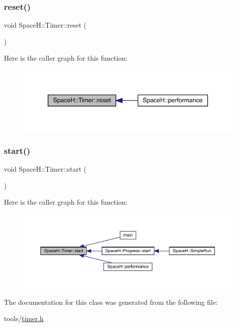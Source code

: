 \subsubsection{\texorpdfstring{reset()}{reset()}}
{\footnotesize\ttfamily void Space\+H\+::\+Timer\+::reset (\begin{DoxyParamCaption}{ }\end{DoxyParamCaption})\hspace{0.3cm}{\ttfamily [inline]}}

Here is the caller graph for this function\+:
\nopagebreak
\begin{figure}[H]
\begin{center}
\leavevmode
\includegraphics[width=339pt]{class_space_h_1_1_timer_a80e119ed1c08d10f36b725cfb85fd8c1_icgraph}
\end{center}
\end{figure}
\mbox{\label{class_space_h_1_1_timer_a54e4e20698afb68d2054d5ebb40fc4b6}} 
\subsubsection{\texorpdfstring{start()}{start()}}
{\footnotesize\ttfamily void Space\+H\+::\+Timer\+::start (\begin{DoxyParamCaption}{ }\end{DoxyParamCaption})\hspace{0.3cm}{\ttfamily [inline]}}

Here is the caller graph for this function\+:
\nopagebreak
\begin{figure}[H]
\begin{center}
\leavevmode
\includegraphics[width=350pt]{class_space_h_1_1_timer_a54e4e20698afb68d2054d5ebb40fc4b6_icgraph}
\end{center}
\end{figure}


The documentation for this class was generated from the following file\+:\begin{DoxyCompactItemize}
\item 
tools/\mbox{\hyperlink{timer_8h}{timer.\+h}}\end{DoxyCompactItemize}
